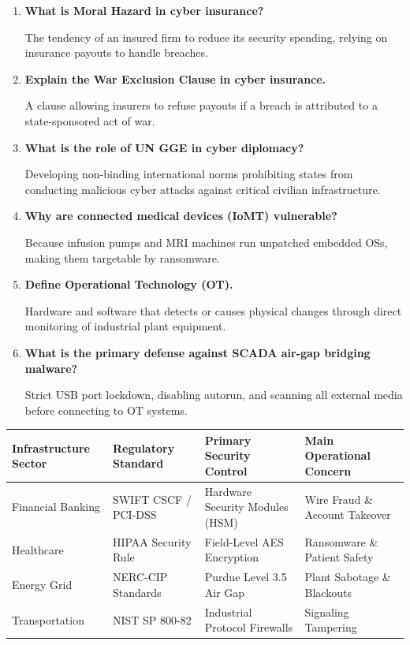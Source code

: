 \documentclass[12pt,a4paper]{article}
\newcommand{\Q}[1]{\textbf{#1}\par\noindent\ignorespaces}
\renewcommand{\arraystretch}{1.45}
\begin{document}
\begin{tcolorbox}[exambox, title={\textbf{Frequently Asked / Viva Questions}}]
\begin{enumerate}[leftmargin=*, label=\textbf{Q\arabic*.}, itemsep=5pt, topsep=0pt]
  \item \Q{What is Moral Hazard in cyber insurance?}
        The tendency of an insured firm to reduce its security spending, relying on insurance payouts to handle breaches.

  \item \Q{Explain the War Exclusion Clause in cyber insurance.}
        A clause allowing insurers to refuse payouts if a breach is attributed to a state-sponsored act of war.

  \item \Q{What is the role of UN GGE in cyber diplomacy?}
        Developing non-binding international norms prohibiting states from conducting malicious cyber attacks against critical civilian infrastructure.

  \item \Q{Why are connected medical devices (IoMT) vulnerable?}
        Because infusion pumps and MRI machines run unpatched embedded OSs, making them targetable by ransomware.

  \item \Q{Define Operational Technology (OT).}
        Hardware and software that detects or causes physical changes through direct monitoring of industrial plant equipment.

  \item \Q{What is the primary defense against SCADA air-gap bridging malware?}
        Strict USB port lockdown, disabling autorun, and scanning all external media before connecting to OT systems.
\end{enumerate}
\end{tcolorbox}

\begin{tcolorbox}[tikzbox, title={Summary Comparison: Infrastructure Security Requirements}]
\centering
{\renewcommand{\arraystretch}{1.45}%
\begin{tabularx}{\linewidth}{|B{3.0cm}|Y|Y|Y|}
\hline
\textbf{Infrastructure Sector} & \textbf{Regulatory Standard} & \textbf{Primary Security Control} & \textbf{Main Operational Concern} \\
\hline
Financial Banking & SWIFT CSCF / PCI-DSS & Hardware Security Modules (HSM) & Wire Fraud \& Account Takeover \\
\hline
Healthcare & HIPAA Security Rule & Field-Level AES Encryption & Ransomware \& Patient Safety \\
\hline
Energy Grid & NERC-CIP Standards & Purdue Level 3.5 Air Gap & Plant Sabotage \& Blackouts \\
\hline
Transportation & NIST SP 800-82 & Industrial Protocol Firewalls & Signaling Tampering \\
\hline
\end{tabularx}}
\end{tcolorbox}
\end{document}

